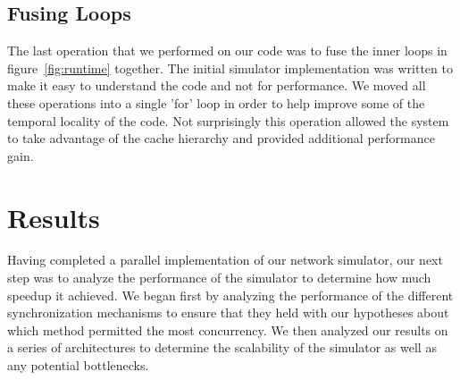 \documentclass[twocolumn]{article}
\begin{document}
\subsection{Fusing Loops}
The last operation that we performed on our code was to fuse the inner loops in figure~\ref{fig:runtime} together.  The initial simulator implementation was written to make it
easy to understand the code and not for performance.  We moved all these operations into a single
'for' loop in order to help improve some of the temporal locality of the
code.  Not surprisingly this operation allowed the system to take
advantage of the cache hierarchy and provided additional performance gain.

\section{Results \label{results}}
Having completed a parallel implementation of our network simulator, our
next step was to analyze the performance of the simulator to determine how
much speedup it achieved.  We began first by analyzing the performance of
the different synchronization mechanisms to ensure that they held with our
hypotheses about which method permitted the most concurrency.  We then analyzed
our results on a series of architectures to determine the scalability of
the simulator as well as any potential bottlenecks.
\end{document}
